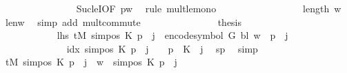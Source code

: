 \begin{isabellebody}
\ \ \ \ \ \ \ \ \ \ \ \ \ \ \isamarkupfalse%
\ Suc{\isacharunderscore}{\kern0pt}leI{\isacharbrackleft}{\kern0pt}OF\ p{}w{\isacharbrackright}{\kern0pt}\ \isamarkupfalse%
\ {\isacharparenleft}{\kern0pt}rule\ mult{\isacharunderscore}{\kern0pt}le{\isacharunderscore}{\kern0pt}mono{}{\isacharparenright}{\kern0pt}\isanewline
\ \ \ \ \ \ \ \ \ \ \ \ \isamarkupfalse%
\ \isamarkupfalse%
\ {\isachardoublequoteopen}{\isasymdots}\ {\isacharequal}{\kern0pt}\ length\ {\isacharquery}{\kern0pt}w{\isacharprime}{\kern0pt}{\isachardoublequoteclose}\ \isamarkupfalse%
\ len{\isacharunderscore}{\kern0pt}w{\isacharprime}{\kern0pt}\ \isamarkupfalse%
\ {\isacharparenleft}{\kern0pt}simp\ add{\isacharcolon}{\kern0pt}\ mult{\isachardot}{\kern0pt}commute{\isacharparenright}{\kern0pt}\isanewline
\ \ \ \ \ \ \ \ \ \ \ \ \isamarkupfalse%
\ \isamarkupfalse%
\ {\isacharquery}{\kern0pt}thesis\ \isakeywordONE{{\isachardot}{\kern0pt}}\isamarkupfalse%
\isanewline
\ \ \ \ \ \ \ \ \ \ \isamarkupfalse%
\isanewline
\ \ \ \ \ \ \ \ \ \ \isamarkupfalse%
\ lhs{\isacharcolon}{\kern0pt}\ {\isachardoublequoteopen}{\isacharquery}{\kern0pt}tM{\isacharprime}{\kern0pt}\ {\isacharparenleft}{\kern0pt}sim{\isacharunderscore}{\kern0pt}pos\ {\isacharquery}{\kern0pt}K\ p\ {\isacharplus}{\kern0pt}\ j{\isacharparenright}{\kern0pt}\ {\isacharequal}{\kern0pt}\ encode{\isacharunderscore}{\kern0pt}symbol\ {\isacharquery}{\kern0pt}G\ {\isacharquery}{\kern0pt}bl\ {\isacharparenleft}{\kern0pt}w\ {\isacharbang}{\kern0pt}\ p{}{\isacharparenright}{\kern0pt}\ {\isacharbang}{\kern0pt}\ j{\isachardoublequoteclose}\isanewline
\ \ \ \ \ \ \ \ \ \ \isamarkupfalse%
\ {\isacharminus}{\kern0pt}\isanewline
\ \ \ \ \ \ \ \ \ \ \ \ \isamarkupfalse%
\ idx{\isacharcolon}{\kern0pt}\ {\isachardoublequoteopen}sim{\isacharunderscore}{\kern0pt}pos\ {\isacharquery}{\kern0pt}K\ p\ {\isacharplus}{\kern0pt}\ j\ {\isacharminus}{\kern0pt}\ {}\ {\isacharequal}{\kern0pt}\ p{}\ {\isacharasterisk}{\kern0pt}\ {\isacharquery}{\kern0pt}K\ {\isacharplus}{\kern0pt}\ j{\isachardoublequoteclose}\ \isamarkupfalse%
\ sp\ \isamarkupfalse%
\ simp\isanewline
\ \ \ \ \ \ \ \ \ \ \ \ \isamarkupfalse%
\ {\isachardoublequoteopen}{\isacharquery}{\kern0pt}tM{\isacharprime}{\kern0pt}\ {\isacharparenleft}{\kern0pt}sim{\isacharunderscore}{\kern0pt}pos\ {\isacharquery}{\kern0pt}K\ p\ {\isacharplus}{\kern0pt}\ j{\isacharparenright}{\kern0pt}\ {\isacharequal}{\kern0pt}\ {\isacharquery}{\kern0pt}w{\isacharprime}{\kern0pt}\ {\isacharbang}{\kern0pt}\ {\isacharparenleft}{\kern0pt}sim{\isacharunderscore}{\kern0pt}pos\ {\isacharquery}{\kern0pt}K\ p\ {\isacharplus}{\kern0pt}\ j\ {\isacharminus}{\kern0pt}\ {}{\isacharparenright}{\kern0pt}{\isachardoublequoteclose}\isanewline

\end{isabellebody}
